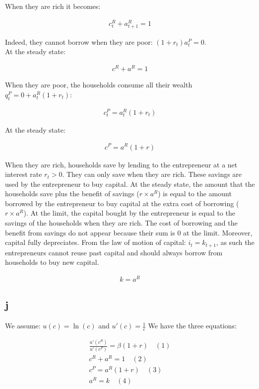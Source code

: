 \documentclass{article}
\begin{document}
When they are rich it becomes:

\begin{gather*}
    c_t^R+a^R_{t+1}= 1
\end{gather*}

Indeed, they cannot borrow when they are poor: $(1+r_t)a_t^P=0$.\\

At the steady state:

\begin{gather*}
    c^R+a^R=1
\end{gather*}

When they are poor, the households consume all their wealth $q_t^P=0+a_t^R(1+r_t)$:

\begin{gather*}
    c_t^P=a^R_t(1+r_t)
\end{gather*}

At the steady state:

\begin{gather*}
    c^P=a^R(1+r)
\end{gather*}

When they are rich, households save by lending to the entrepreneur at a net interest rate $r_t>0$. They can only save when they are rich. These savings are used by the entrepreneur to buy capital.  At the steady state, the amount that the households save plus the benefit of savings ($r\times a^R$) is equal to the amount borrowed by the entrepreneur to buy capital at the extra cost of borrowing  ($r \times a^R$). At the limit, the capital bought by the entrepreneur is equal to the savings of the households when they are rich. The cost of borrowing and the benefit from savings do not appear because their sum is 0 at the limit. Moreover, capital fully depreciates. From the law of motion of capital: $i_t=k_{t+1}$, as such the entrepreneurs cannot reuse past capital and should always borrow from households to buy new capital.

\begin{gather*}
    k=a^R
\end{gather*}

\subsection{j}

We assume: $ u(c)=\ln(c)$ and $ u'(c)=\frac{1}{c}$
We have the three equations:

\begin{gather*}
    \frac{u'(c^R)}{u'(c^P)}=\beta (1+r)\quad (1)\\
    c^R+a^R=1\quad (2)\\
    c^P=a^R(1+r)\quad (3)\\
    a^R=k\quad (4)
\end{gather*}
\end{document}
